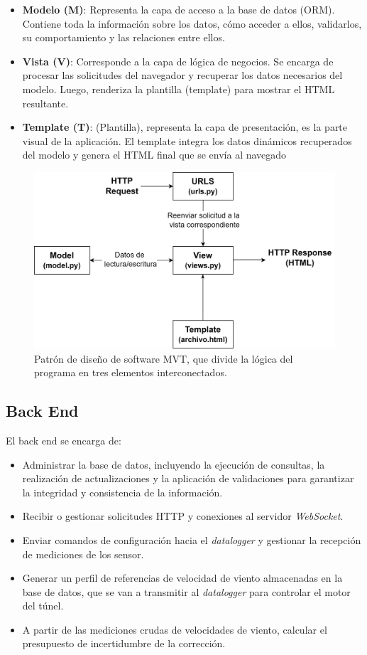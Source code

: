 \begin{itemize}
    \item \textbf{Modelo (M)}: Representa la capa de acceso a la base de datos (ORM). Contiene toda la información sobre los datos, cómo acceder a ellos, validarlos, su comportamiento y las relaciones entre ellos.
    \item \textbf{Vista (V)}:  Corresponde a la capa de lógica de negocios. Se encarga de procesar las solicitudes del navegador y recuperar los datos necesarios del modelo. Luego, renderiza la plantilla (template) para mostrar el HTML resultante.
    \item \textbf{Template (T)}: (Plantilla), representa la capa de presentación, es la parte visual de la aplicación. El template integra los datos dinámicos recuperados del modelo y genera el HTML final que se envía al navegado

\end{itemize}
\begin{figure}[H]
    \centering
    \includegraphics[width=0.8\linewidth]{Figuras/AplicacionWeb/patronMVT.png}
    \caption{Patrón de diseño de software MVT, que divide la lógica del programa en tres elementos interconectados.}
    \label{fig:patronMVT}
\end{figure}

\subsection{Back End}\label{sec:back_end}
El back end se encarga de:
\begin{itemize}
    \item Administrar la base de datos, incluyendo la ejecución de consultas, la realización de actualizaciones y la aplicación de validaciones para garantizar la integridad y consistencia de la información.
    \item Recibir o gestionar solicitudes HTTP y conexiones al servidor \textit{WebSocket}.
    \item Enviar comandos de configuración hacia el \textit{datalogger} y gestionar la recepción de mediciones de los sensor.
    \item Generar un perfil de referencias de velocidad de viento almacenadas en la base de datos, que se van a transmitir al \textit{datalogger} para controlar el motor del túnel.
    \item A partir de las mediciones crudas de velocidades de viento, calcular el presupuesto de incertidumbre de la corrección.
\end{itemize}

